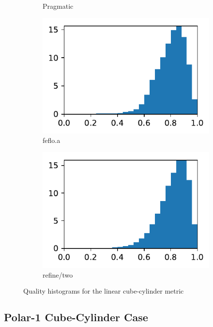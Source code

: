 \documentclass[3p,times,procedia,number]{elsarticle}
\begin{document}
\begin{figure}
\begin{subfigure}{.16\textwidth}
\caption{Pragmatic}
\end{subfigure}
\begin{subfigure}{.16\textwidth}
\centering
\includegraphics[width=\textwidth]{fefloa-cube-cylinder-linear-quality.pdf}
\caption{feflo.a}
\end{subfigure}
\begin{subfigure}{.16\textwidth}
\centering
\includegraphics[width=\textwidth]{refine-two-cube-cylinder-linear-quality.pdf}
\caption{refine/two}
\end{subfigure}
\caption{Quality histograms for the linear cube-cylinder metric}
\label{fig:cube-cylinder-linear-qualities}
\end{figure}

\subsection{Polar-1 Cube-Cylinder Case}
\label{sec:cube-cylinder-polar-1}
\end{document}

